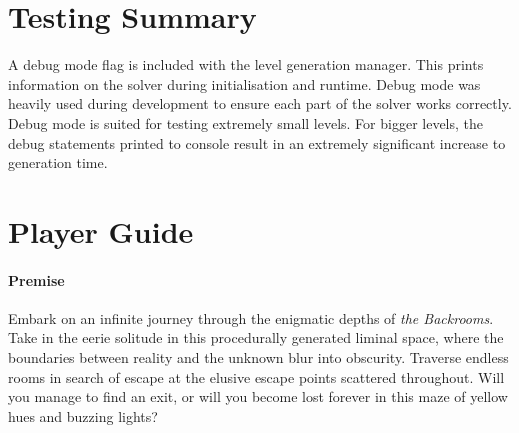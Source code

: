 \appendix
\chapter{Testing Summary}
A debug mode flag is included with the level generation manager. This prints information on the solver during initialisation and runtime. Debug mode was heavily used during development to ensure each part of the solver works correctly. Debug mode is suited for testing extremely small levels. For bigger levels, the debug statements printed to console result in an extremely significant increase to generation time.

\chapter{Player Guide}
\subsubsection{Premise}

Embark on an infinite journey through the enigmatic depths of \textit{the Backrooms}. Take in the eerie solitude in this procedurally generated liminal space, where the boundaries between reality and the unknown blur into obscurity. Traverse endless rooms in search of escape at the elusive escape points scattered throughout. Will you manage to find an exit, or will you become lost forever in this maze of yellow hues and buzzing lights?



